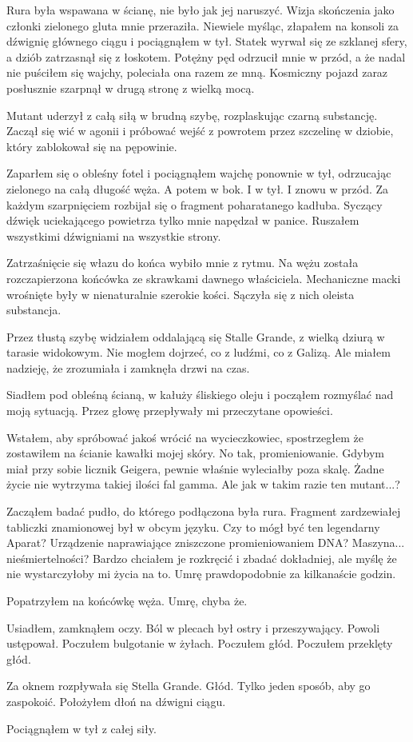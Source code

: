 Rura była wspawana w ścianę, nie było jak jej naruszyć. Wizja skończenia jako członki zielonego gluta mnie przeraziła.
Niewiele myśląc, złapałem na konsoli za dźwignię głównego ciągu i pociągnąłem w tył.
Statek wyrwał się ze szklanej sfery, a dziób zatrzasnął się z łoskotem.
Potężny pęd odrzucił mnie w przód, a że nadal nie puściłem się wajchy, poleciała ona razem ze mną.
Kosmiczny pojazd zaraz posłusznie szarpnął w drugą stronę z wielką mocą.

Mutant uderzył z całą siłą w brudną szybę, rozplaskując czarną substancję. Zaczął się wić w agonii i próbować wejść z powrotem przez szczelinę w dziobie, który zablokował się na pępowinie.

Zaparłem się o obleśny fotel i pociągnąłem wajchę ponownie w tył, odrzucając zielonego na całą długość węża.
A potem w bok. I w tył. I znowu w przód.
Za każdym szarpnięciem rozbijał się o fragment poharatanego kadłuba.
Syczący dźwięk uciekającego powietrza tylko mnie napędzał w panice.
Ruszałem wszystkimi dźwigniami na wszystkie strony.

Zatrzaśnięcie się włazu do końca wybiło mnie z rytmu.
Na wężu została rozczapierzona końcówka ze skrawkami dawnego właściciela.
Mechaniczne macki wrośnięte były w nienaturalnie szerokie kości.
Sączyła się z nich oleista substancja.

Przez tłustą szybę widziałem oddalającą się Stalle Grande, z wielką dziurą w tarasie widokowym.
Nie mogłem dojrzeć, co z ludźmi, co z Galizą.
Ale miałem nadzieję, że zrozumiała i zamknęła drzwi na czas.

Siadłem pod obleśną ścianą, w kałuży śliskiego oleju i począłem rozmyślać nad moją sytuacją.
Przez głowę przepływały mi przeczytane opowieści.

Wstałem, aby spróbować jakoś wrócić na wycieczkowiec, spostrzegłem że zostawiłem na ścianie kawałki mojej skóry.
No tak, promieniowanie. Gdybym miał przy sobie licznik Geigera, pewnie właśnie wyleciałby poza skalę.
Żadne życie nie wytrzyma takiej ilości fal gamma.
Ale jak w takim razie ten mutant...?

Zacząłem badać pudło, do którego podłączona była rura.
Fragment zardzewiałej tabliczki znamionowej był w obcym języku.
Czy to mógł być ten legendarny Aparat?
Urządzenie naprawiające zniszczone promieniowaniem DNA? Maszyna... nieśmiertelności?
Bardzo chciałem je rozkręcić i zbadać dokładniej, ale myślę że nie wystarczyłoby mi życia na to.
Umrę prawdopodobnie za kilkanaście godzin.

Popatrzyłem na końcówkę węża.
Umrę, chyba że.

Usiadłem, zamknąłem oczy.
Ból w plecach był ostry i przeszywający.
Powoli ustępował.
Poczułem bulgotanie w żyłach.
Poczułem głód.
Poczułem przeklęty głód.

Za oknem rozpływała się Stella Grande. Głód. Tylko jeden sposób, aby go zaspokoić.
Położyłem dłoń na dźwigni ciągu.

Pociągnąłem w tył z całej siły.



